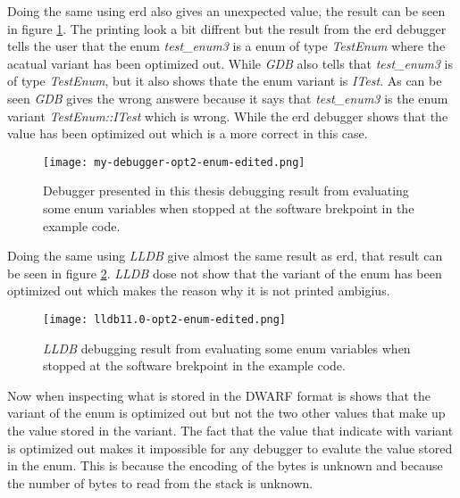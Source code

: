 Doing the same using \gls{erd} also gives an unexpected value, the result can be seen in  figure \ref{fig:mydebuggerenum}.
The printing look a bit diffrent but the result from the \gls{erd} debugger tells the user that the enum \emph{test\_enum3} is a enum of type \emph{TestEnum} where the acatual variant has been optimized out.
While \emph{GDB} also tells that \emph{test\_enum3} is of type \emph{TestEnum}, but it also shows thate the enum variant is \emph{ITest}.
As can be seen \emph{GDB} gives the wrong answere because it says that \emph{test\_enum3} is the enum variant \emph{TestEnum::ITest} which is wrong.
While the \gls{erd} debugger shows that the value has been optimized out which is a more correct in this case.


\begin{figure}[h]
	\centering
	\texttt{[image: my-debugger-opt2-enum-edited.png]}
	\caption{Debugger presented in this thesis debugging result from evaluating some enum variables when stopped at the software brekpoint in the example code.}
	\label{fig:mydebuggerenum}
\end{figure}


Doing the same using \emph{LLDB} give almost the same result as \gls{erd}, that result can be seen in figure \ref{fig:lldbenum}.
\emph{LLDB} dose not show that the variant of the enum has been optimized out which makes the reason why it is not printed ambigius.


\begin{figure}[h]
	\centering
	\texttt{[image: lldb11.0-opt2-enum-edited.png]}
	\caption{\emph{LLDB} debugging result from evaluating some enum variables when stopped at the software brekpoint in the example code.}
	\label{fig:lldbenum}
\end{figure}


Now when inspecting what is stored in the \gls{DWARF} format is shows that the variant of the enum is optimized out but not the two other values that make up the value stored in the variant.
The fact that the value that indicate with variant is optimized out makes it impossible for any debugger to evalute the value stored in the enum.
This is because the encoding of the bytes is unknown and because the number of bytes to read from the stack is unknown.



